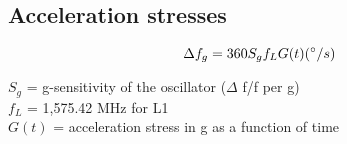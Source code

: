 \begin{comment}
In recent years significant progress has been made in
crystal resonator design to effect a substantial reduction in
g-sensitivity values [1]. With such reduced levels of
acceleration sensitivity, the need has arisen for a
measurement system with appropriately higher resolution.
The most obvious method for determination of g-sensitivity
for a stable ovenized oscillator is the '2g tip over
test', where the whole oscillator is simply inverted, resulting
in an incremental 2g change in the internal forces applied to
the resonator [2]. However, since the changes are in the
order of 1.10-9 per g, the oscillator temperature must be prestabilized,
and this can be a long process. With this method,
care must also be taken to avoid convectional temperature
effects in the oven cavity, which can cause misleading
results.
In this work, for g-sensitivity measurement, the method
that has been implemented is based on the imposition of an
essentially sinusoidal low frequency vibration field on the
resonator by placing the device on a vibration table, and
then observing the modulation effects on the resonator
frequency.
The method is applicable to any repetitive stimulus to
which the frequency of the resonator exhibits sensitivity.
Such stimuli could include pressure, electromagnetic
radiation effects, magnetic fields, neutron radiation, and so
on.
\end{comment}

\cite{2GTipover}


\subsection{Acceleration stresses}

\begin{equation}
\Delta f_g = 360 S_g f_L G(t) (\degree/s)
\end{equation}
\cite{Kaplan}

\begin{framed}
$S_g$ = g-sensitivity of the oscillator ($\Delta$ f/f per g) \\
$f_L$ = 1,575.42 MHz for L1 \\
$G(t)$ = acceleration stress in g as a function of time
\end{framed}

